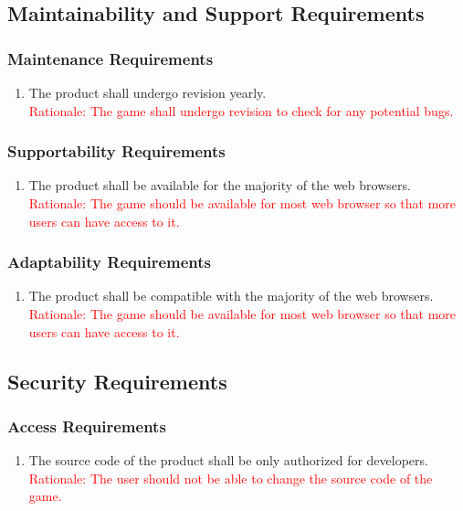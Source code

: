 \documentclass[12pt, titlepage]{article}
\begin{document}
\subsection{Maintainability and Support Requirements}
\subsubsection{Maintenance Requirements}
\begin{enumerate}
    \item The product shall undergo revision yearly.\\
    \textcolor{red}{Rationale: The game shall undergo revision to check for any potential bugs.}
\end{enumerate}

\subsubsection{Supportability Requirements}
\begin{enumerate}
    \item The product shall be available for the majority of the web browsers.\\
    \textcolor{red}{Rationale: The game should be available for most web browser so that more users can have access to it.}
    
\end{enumerate}

\subsubsection{Adaptability Requirements}
\begin{enumerate}
    \item The product shall be compatible with the majority of the web browsers.\\
    \textcolor{red}{Rationale: The game should be available for most web browser so that more users can have access to it.}
\end{enumerate}

\subsection{Security Requirements}
\subsubsection{Access Requirements}
\begin{enumerate}
    \item The source code of the product shall be only authorized for developers.\\
    \textcolor{red}{Rationale: The user should not be able to change the source code of the game.}
\end{enumerate}
\end{document}
